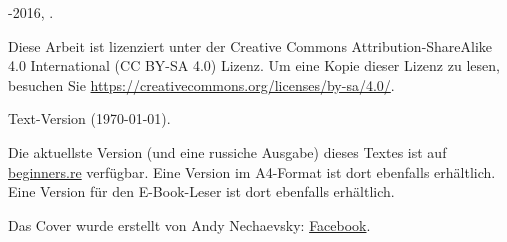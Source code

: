 \begin{titlepage}


\end{titlepage}

\newpage

\begin{center}
\vspace*{\fill}
{\LARGE \TITLE}

\vspace*{\fill}

{\large \AUTHOR}

{\large \TT{<\EMAIL>}}
\vspace*{\fill}
\vfill

\ccbysa

-2016, \AUTHOR. 

Diese Arbeit ist lizenziert unter der Creative Commons Attribution-ShareAlike 4.0 International (CC BY-SA 4.0) Lizenz.
Um eine Kopie dieser Lizenz zu lesen, besuchen Sie \url{https://creativecommons.org/licenses/by-sa/4.0/}.

Text-Version ({\large \today}).

Die aktuellste Version (und eine russiche Ausgabe) dieses Textes ist auf \href{http://go.yurichev.com/17009}{beginners.re} verfügbar.
\ifdefined\ebook
Eine Version im A4-Format ist dort ebenfalls erhältlich.
\else
Eine Version für den E-Book-Leser ist dort ebenfalls erhältlich.
\fi

Das Cover wurde erstellt von Andy Nechaevsky: \href{http://go.yurichev.com/17023}{Facebook}.

\end{center}

